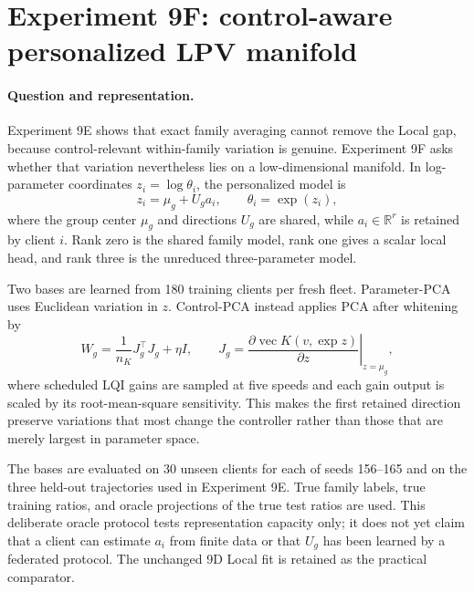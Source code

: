 \section{Experiment 9F: control-aware personalized LPV manifold}
\label{sec:experiment9f}

\paragraph{Question and representation.}
Experiment 9E shows that exact family averaging cannot remove the Local gap,
because control-relevant within-family variation is genuine. Experiment 9F asks
whether that variation nevertheless lies on a low-dimensional manifold. In
log-parameter coordinates $z_i=\log\theta_i$, the personalized model is
\begin{equation}
 z_i=\mu_g+U_g a_i,
 \qquad \theta_i=\exp(z_i),
 \label{eq:personalized-manifold}
\end{equation}
where the group center $\mu_g$ and directions $U_g$ are shared, while
$a_i\in\mathbb{R}^r$ is retained by client $i$. Rank zero is the shared family
model, rank one gives a scalar local head, and rank three is the unreduced
three-parameter model.

Two bases are learned from 180 training clients per fresh fleet. Parameter-PCA
uses Euclidean variation in $z$. Control-PCA instead applies PCA after whitening
by
\begin{equation}
 W_g=\frac{1}{n_K}J_g^\top J_g+\eta I,
 \qquad
 J_g=\left.\frac{\partial\operatorname{vec}K(v,\exp z)}{\partial z}
 \right|_{z=\mu_g},
 \label{eq:control-metric}
\end{equation}
where scheduled LQI gains are sampled at five speeds and each gain output is
scaled by its root-mean-square sensitivity. This makes the first retained
direction preserve variations that most change the controller rather than
those that are merely largest in parameter space.

The bases are evaluated on 30 unseen clients for each of seeds 156--165 and on
the three held-out trajectories used in Experiment 9E. True family labels, true
training ratios, and oracle projections of the true test ratios are used. This
deliberate oracle protocol tests representation capacity only; it does not yet
claim that a client can estimate $a_i$ from finite data or that $U_g$ has been
learned by a federated protocol. The unchanged 9D Local fit is retained as the
practical comparator.

